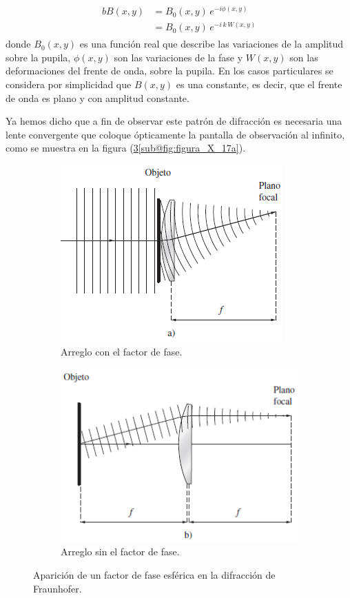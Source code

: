 \documentclass[14pt]{extarticle}
\begin{document}
\begin{align}
\begin{aligned}{b}
B (x, y) &= B_{0} (x, y) \, e^{- i \phi (x, y)} \\
&= B_{0} (x, y) \, e^{- i \, k \, W (x, y)}
\end{aligned}
\label{eq:ecuacion_X_44}
\end{align}
donde $B_{0} (x, y)$ es una función real que describe las variaciones de la amplitud sobre la pupila, $\phi (x, y)$ son las variaciones de la fase y $W (x, y)$ son las deformaciones del frente de onda, sobre la pupila. En los casos particulares se considera por simplicidad que $B (x, y)$ es una constante, es decir, que el frente de onda es plano y con amplitud constante.
\par
Ya hemos dicho que a fin de observar este patrón de difracción es necesaria una lente convergente que coloque ópticamente la pantalla de observación al infinito, como se muestra en la figura (\ref{fig:figura_X_17}\ref{sub@fig:figura_X_17a}).
\begin{figure}[H]
    \begin{subfigure}{0.5\linewidth}
        \centering
        \includegraphics[scale=0.8]{Imagenes/Difraccion_17a.png}
        \caption{Arreglo con el factor de fase.}
        \label{fig:figura_X_17a}
    \end{subfigure}%
    \begin{subfigure}{0.5\linewidth}
        \centering
        \includegraphics[scale=0.8]{Imagenes/Difraccion_17b.png}
        \caption{Arreglo sin el factor de fase.}
        \label{fig:figura_X_17b}
    \end{subfigure}
    \caption{Aparición de un factor de fase esférica en la difracción de Fraunhofer.}
    \label{fig:figura_X_17}
\end{figure}
\end{document}
